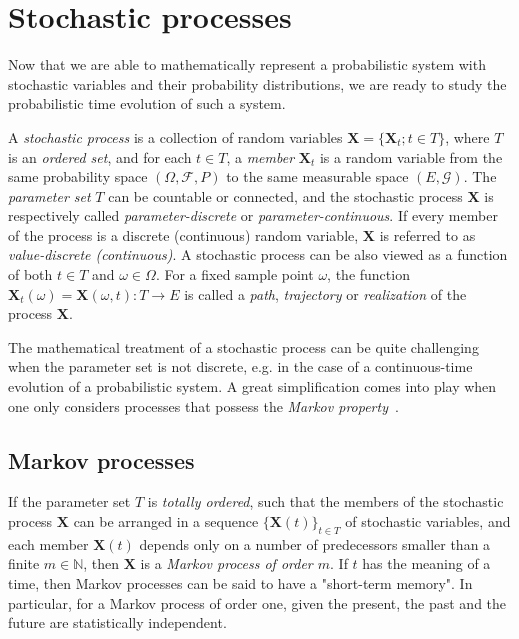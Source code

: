 \documentclass[a4paper,12pt]{book}
\begin{document}
\section{Stochastic processes}
Now that we are able to mathematically represent a probabilistic system with stochastic variables and their probability distributions, we are ready to study the probabilistic time evolution of such a system. 

A \textit{stochastic process} is a collection of random variables $\bm{X} = \{\bm{X}_t; t\in T\}$, where $T$ is an \textit{ordered set}, and for each $t \in T$, a \textit{member} $\bm{X}_t$ is a random variable from the same probability space $(\Omega,\mathcal{F}, P)$ to the same measurable space $(E,\mathcal{G})$. The \textit{parameter set} $T$ can be countable or connected, and the stochastic process $\bm{X}$ is respectively called \textit{parameter-discrete} or \textit{parameter-continuous}. If every member of the process is a discrete (continuous) random variable, $\bm{X}$ is referred to as \textit{value-discrete (continuous)}. 
A stochastic process can be also viewed as a function of both $t \in T$ and $\omega \in \Omega$. For a fixed sample point $\omega$, the function $\bm{X}_t(\omega) = \bm{X}(\omega,t) : T \to E$ is called a \textit{path}, \textit{trajectory} or \textit{realization} of the process $\bm{X}$. 


The mathematical treatment of a stochastic process can be quite challenging when the parameter set is not discrete, e.g. in the case of a continuous-time evolution of a probabilistic system. A great simplification comes into play when one only considers processes that possess the \textit{Markov property}~\parencite{Markov1906}.

\subsection{Markov processes}
If the parameter set $T$ is \textit{totally ordered}, such that the members of the stochastic process $\bm{X}$ can be arranged in a sequence $\{ \bm{X}(t)  \}_{t\in T}$ of stochastic variables, and each member $\bm{X}(t)$ depends only on a number of predecessors smaller than a finite $m \in \mathbb{N}$, then $\bm{X}$ is a \textit{Markov process of order $m$}. If $t$ has the meaning of a time, then Markov processes can be said to have a "short-term memory". In particular, for a Markov process of order one, given the present, the past and the future are statistically independent. 
\end{document}
